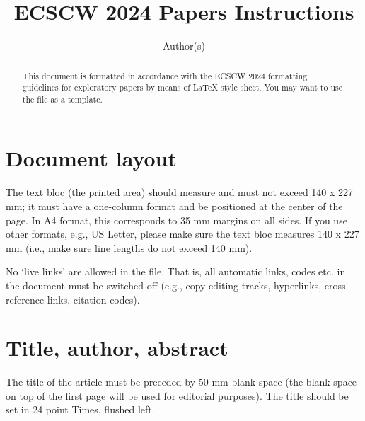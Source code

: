\documentclass{ecscw2007}
\begin{document}
\title{ECSCW 2024 Papers Instructions}

\author{Author(s)}


\maketitle

\begin{abstract}
This document is formatted in accordance with the ECSCW 2024 formatting guidelines for exploratory papers by means of
\LaTeX{} style sheet. You may want to use the file as a template.
\end{abstract}

\section*{Document layout}

The text bloc (the printed area) should measure and must not exceed 140 x 227 mm; it must have a one-column format and be positioned at the center of the page. In A4 format, this corresponds to 35 mm margins on all sides. If you use other formats, e.g., US Letter, please make sure the text bloc measures 140 x 227 mm (i.e., make sure line lengths do not exceed 140 mm).

No `live links' are allowed in the file. That is, all automatic links, codes etc. in the document must be switched off (e.g., copy editing tracks, hyperlinks, cross reference links, citation codes).

\section*{Title, author, abstract}

The title of the article must be preceded by 50 mm blank space (the blank space on top of the first page will be used for editorial purposes). The title should be set in 24 point Times, flushed left.
\end{document}
